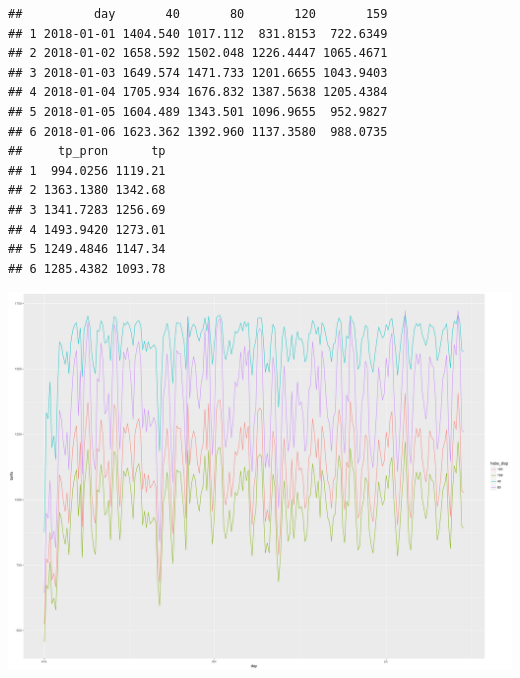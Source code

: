 \documentclass{article}\usepackage[]{graphicx}\usepackage[]{color}
\makeatletter
\def\maxwidth{ %
  \ifdim\Gin@nat@width>\linewidth
    \linewidth
  \else
    \Gin@nat@width
  \fi
}
\newenvironment{kframe}{%
 \def\at@end@of@kframe{}%
 \ifinner\ifhmode%
  \def\at@end@of@kframe{\end{minipage}}%
  \begin{minipage}{\columnwidth}%
 \fi\fi%
 \def\FrameCommand##1{\hskip\@totalleftmargin \hskip-\fboxsep
 \colorbox{shadecolor}{##1}\hskip-\fboxsep
     \hskip-\linewidth \hskip-\@totalleftmargin \hskip\columnwidth}%
 \MakeFramed {\advance\hsize-\width
   \@totalleftmargin\z@ \linewidth\hsize
   \@setminipage}}%
 {\par\unskip\endMakeFramed%
 \at@end@of@kframe}
\newenvironment{knitrout}{}{} %
\makeatother
\begin{document}
\begin{knitrout}
\color{fgcolor}\begin{kframe}
\begin{verbatim}
##          day       40       80       120       159
## 1 2018-01-01 1404.540 1017.112  831.8153  722.6349
## 2 2018-01-02 1658.592 1502.048 1226.4447 1065.4671
## 3 2018-01-03 1649.574 1471.733 1201.6655 1043.9403
## 4 2018-01-04 1705.934 1676.832 1387.5638 1205.4384
## 5 2018-01-05 1604.489 1343.501 1096.9655  952.9827
## 6 2018-01-06 1623.362 1392.960 1137.3580  988.0735
##     tp_pron      tp
## 1  994.0256 1119.21
## 2 1363.1380 1342.68
## 3 1341.7283 1256.69
## 4 1493.9420 1273.01
## 5 1249.4846 1147.34
## 6 1285.4382 1093.78
\end{verbatim}
\end{kframe}
\includegraphics[width=\maxwidth]{figures/Pricing_graph-1} 

\end{knitrout}
\end{document}
